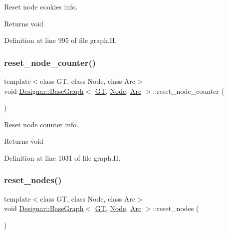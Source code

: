 Reset node cookies info. 

\begin{DoxyReturn}{Returns}
void 
\end{DoxyReturn}


Definition at line 995 of file graph.\+H.

\mbox{\label{class_designar_1_1_base_graph_a53603f64b51b470cc6b8c8d6d2b643a4}} 
\subsubsection{\texorpdfstring{reset\+\_\+node\+\_\+counter()}{reset\_node\_counter()}}
{\footnotesize\ttfamily template$<$class GT, class Node, class Arc$>$ \\
void \hyperlink{class_designar_1_1_base_graph}{Designar\+::\+Base\+Graph}$<$ \hyperlink{demo-buildgraph_8_c_a3001c40d2c31ca87ed96cd7d1334a55e}{GT}, \hyperlink{namespace_designar_a5af326c65aa2bd26b26c410f2030d09e}{Node}, \hyperlink{namespace_designar_a3f55fb5513d62ff47cbc8f72b8e95d6f}{Arc} $>$\+::reset\+\_\+node\+\_\+counter (\begin{DoxyParamCaption}{ }\end{DoxyParamCaption})\hspace{0.3cm}{\ttfamily [inline]}}



Reset node counter info. 

\begin{DoxyReturn}{Returns}
void 
\end{DoxyReturn}


Definition at line 1031 of file graph.\+H.

\mbox{\label{class_designar_1_1_base_graph_a1b21c48fed41f36ad4158d718f837c89}} 
\subsubsection{\texorpdfstring{reset\+\_\+nodes()}{reset\_nodes()}}
{\footnotesize\ttfamily template$<$class GT, class Node, class Arc$>$ \\
void \hyperlink{class_designar_1_1_base_graph}{Designar\+::\+Base\+Graph}$<$ \hyperlink{demo-buildgraph_8_c_a3001c40d2c31ca87ed96cd7d1334a55e}{GT}, \hyperlink{namespace_designar_a5af326c65aa2bd26b26c410f2030d09e}{Node}, \hyperlink{namespace_designar_a3f55fb5513d62ff47cbc8f72b8e95d6f}{Arc} $>$\+::reset\+\_\+nodes (\begin{DoxyParamCaption}{ }\end{DoxyParamCaption})\hspace{0.3cm}{\ttfamily [inline]}}



